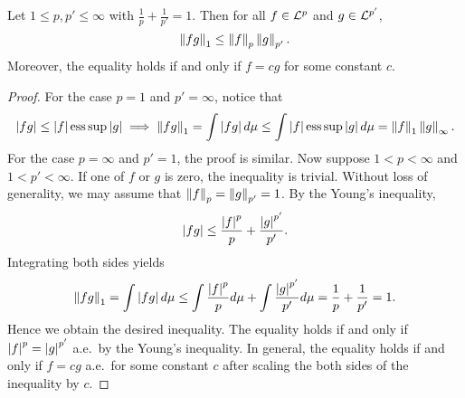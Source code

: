 \begin{theorem}
    Let $1\leq p,p'\leq\infty$ with $\frac{1}{p}+\frac{1}{p'}=1$. 
    Then for all $f\in\mathcal{L}^p$ and $g\in\mathcal{L}^{p'}$, 
    \begin{equation*}
        \left\lVert {fg} \right\rVert_1 \leq \left\lVert {f} \right\rVert_p\left\lVert {g} \right\rVert_{p'}.
    \end{equation*}
    Moreover, the equality holds if and only if $f = cg$ for some 
    constant $c$.
\end{theorem}
\begin{proof}
    For the case $p = 1$ and $p' = \infty$, notice that
    \begin{equation*}
        \left\lvert {fg} \right\rvert \leq \left\lvert {f} \right\rvert\operatorname{ess\,sup} \left\lvert {g} \right\rvert \implies 
        \left\lVert {fg} \right\rVert_1 = \int \left\lvert {fg} \right\rvert d\mu \leq \int \left\lvert {f} \right\rvert\operatorname{ess\,sup}\left\lvert {g} \right\rvert d\mu = \left\lVert {f} \right\rVert_1\left\lVert {g} \right\rVert_\infty.
    \end{equation*}
    For the case $p = \infty$ and $p' = 1$, the proof is similar. 
    Now suppose $1<p<\infty$ and $1<p'<\infty$. If one of $f$ or 
    $g$ is zero, the inequality is trivial. Without loss of 
    generality, we may assume that $\left\lVert {f} \right\rVert_p = \left\lVert {g} \right\rVert_{p'} = 1$. 
    By the Young's inequality, 
    \begin{equation*}
        \left\lvert {fg} \right\rvert \leq \frac{\left\lvert {f} \right\rvert^p}{p} + \frac{\left\lvert {g} \right\rvert^{p'}}{p'}.
    \end{equation*}
    Integrating both sides yields
    \begin{equation*}
        \left\lVert {fg} \right\rVert_1 = \int \left\lvert {fg} \right\rvert d\mu \leq \int \frac{\left\lvert {f} \right\rvert^p}{p}d\mu + \int \frac{\left\lvert {g} \right\rvert^{p'}}{p'}d\mu 
        = \frac{1}{p} + \frac{1}{p'} = 1.
    \end{equation*}
    Hence we obtain the desired inequality. The equality holds if 
    and only if $\left\lvert {f} \right\rvert^p = \left\lvert {g} \right\rvert^{p'}$ a.e.\ by the Young's inequality. 
    In general, the equality holds if and only if $f = cg$ a.e.\ for some 
    constant $c$ after scaling the both sides of the inequality by $c$.
\end{proof}

